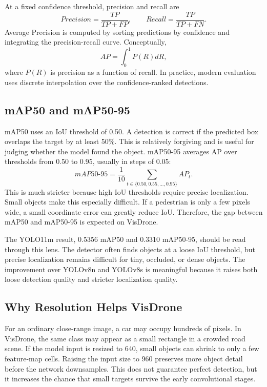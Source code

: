 \documentclass[10pt,twocolumn]{article}
\begin{document}
At a fixed confidence threshold, precision and recall are
\begin{equation}
Precision=\frac{TP}{TP+FP}, \qquad Recall=\frac{TP}{TP+FN}.
\end{equation}
Average Precision is computed by sorting predictions by confidence and integrating the precision-recall curve. Conceptually,
\begin{equation}
AP=\int_0^1 P(R)dR,
\end{equation}
where $P(R)$ is precision as a function of recall. In practice, modern evaluation uses discrete interpolation over the confidence-ranked detections.

\subsection{mAP50 and mAP50-95}

mAP50 uses an IoU threshold of 0.50. A detection is correct if the predicted box overlaps the target by at least 50\%. This is relatively forgiving and is useful for judging whether the model found the object. mAP50-95 averages AP over thresholds from 0.50 to 0.95, usually in steps of 0.05:
\begin{equation}
mAP50\text{-}95=\frac{1}{10}\sum_{t\in\{0.50,0.55,\ldots,0.95\}} AP_t.
\end{equation}
This is much stricter because high IoU thresholds require precise localization. Small objects make this especially difficult. If a pedestrian is only a few pixels wide, a small coordinate error can greatly reduce IoU. Therefore, the gap between mAP50 and mAP50-95 is expected on VisDrone.

The YOLO11m result, 0.5356 mAP50 and 0.3310 mAP50-95, should be read through this lens. The detector often finds objects at a loose IoU threshold, but precise localization remains difficult for tiny, occluded, or dense objects. The improvement over YOLOv8n and YOLOv8s is meaningful because it raises both loose detection quality and stricter localization quality.

\subsection{Why Resolution Helps VisDrone}

For an ordinary close-range image, a car may occupy hundreds of pixels. In VisDrone, the same class may appear as a small rectangle in a crowded road scene. If the model input is resized to 640, small objects can shrink to only a few feature-map cells. Raising the input size to 960 preserves more object detail before the network downsamples. This does not guarantee perfect detection, but it increases the chance that small targets survive the early convolutional stages.
\end{document}
